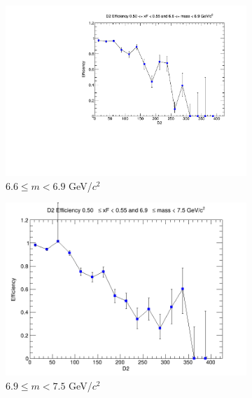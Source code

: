 \documentclass[11pt]{article}
\begin{document}
\begin{figure}[p]
\begin{subfigure}[b]{0.32\textwidth}
        \includegraphics[width=\textwidth]{./kTrackerEfficiencyPlots/D2_Efficiency_xF10_mass8.pdf}
        \caption{$6.6 \leq m < 6.9$ GeV/$c^2$}
    \end{subfigure}\vspace{0.5cm}
    \begin{subfigure}[b]{0.32\textwidth}
        \centering
        \includegraphics[width=\textwidth]{./kTrackerEfficiencyPlots/D2_Efficiency_xF10_mass9.png}
        \caption{$6.9 \leq m < 7.5$ GeV/$c^2$}
    \end{subfigure}\hfill
    \begin{subfigure}[b]{0.32\textwidth}
        \centering

\end{subfigure}
\end{figure}
\end{document}
